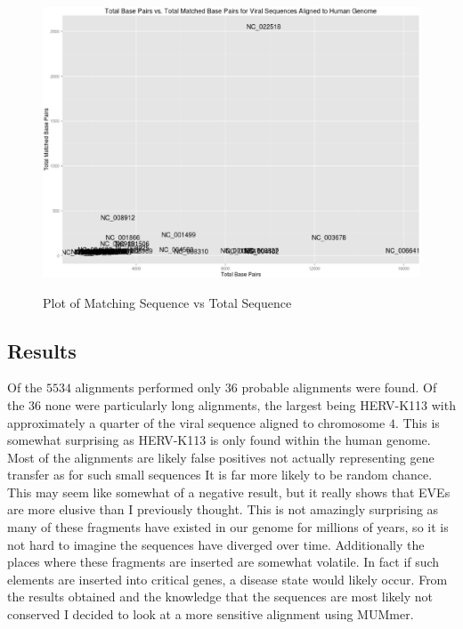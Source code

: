 \begin{figure}
\caption{Plot of Matching Sequence vs Total Sequence}
\includegraphics[width=\textwidth]{img/bowtie2results.eps}
\label{fig:bowtieplot}
\end{figure}




\subsection{Results}

Of the $5534$ alignments performed only $36$ probable alignments were found. Of the $36$ none were particularly long alignments, the largest being HERV-K113 with approximately a quarter of the viral sequence aligned to chromosome $4$. This is somewhat surprising as HERV-K113 is only found within the human genome. Most of the alignments are likely false positives not actually representing gene transfer as for such small sequences It is far more likely to be random chance. This may seem like somewhat of a negative result, but it really shows that EVEs are more elusive than I previously thought. This is not amazingly surprising as many of these fragments have existed in our genome for millions of years, so it is not hard to imagine the sequences have diverged over time. Additionally the places where these fragments are inserted are somewhat volatile. In fact if such elements are inserted into critical genes, a disease state would likely occur. From the results obtained and the knowledge that the sequences are most likely not conserved I decided to look at a more sensitive alignment using MUMmer.